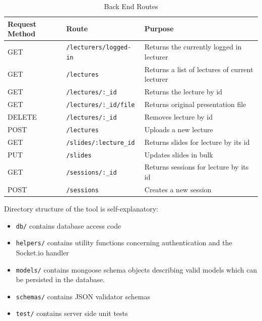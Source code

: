 \begin{table}[h!]
\centering
\begin{tabular}{|l|l|l|}
\hline
\textbf{Request Method} & \textbf{Route} & \textbf{Purpose} \\ \hline
GET   & \texttt{/lecturers/logged-in} & Returns the currently logged in lecturer \\ \hline

GET   & \texttt{/lectures}            & Returns a list of lectures of current lecturer \\ \hline
GET   & \texttt{/lectures/:\_id} & Returns the lecture by id \\ \hline
GET   & \texttt{/lectures/:\_id/file} & Returns original presentation file \\ \hline
DELETE   & \texttt{/lectures/:\_id} & Removes lecture by id \\ \hline
POST   & \texttt{/lectures} & Uploads a new lecture \\ \hline

GET   & \texttt{/slides/:lecture\_id} & Returns slides for lecture by its id \\ \hline
PUT   & \texttt{/slides} & Updates slides in bulk \\ \hline

GET   & \texttt{/sessions/:\_id} & Returns sessions for lecture by its id \\ \hline
POST   & \texttt{/sessions} & Creates a new session \\ \hline

\end{tabular}
\caption{Back End Routes}
\label{tab:routes}
\end{table}

Directory structure of the tool is self-explanatory:
\begin{itemize}
  \item \texttt{db/} contains database access code
  \item \texttt{helpers/} contains utility functions concerning authentication and the Socket.io handler
  \item \texttt{models/} contains mongoose schema objects describing valid models which can be persisted in the database.
  \item \texttt{schemas/} contains JSON validator schemas
  \item \texttt{test/} contains server side unit tests
\end{itemize}

